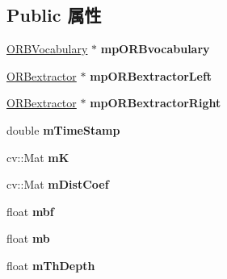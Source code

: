 \subsection*{Public 属性}
\begin{DoxyCompactItemize}
\item 
\hypertarget{classORB__SLAM2_1_1Frame_a4c54c9963da838cd6fa83a65930bd1b7}{\hyperlink{classDBoW2_1_1TemplatedVocabulary}{O\-R\-B\-Vocabulary} $\ast$ {\bfseries mp\-O\-R\-Bvocabulary}}\label{classORB__SLAM2_1_1Frame_a4c54c9963da838cd6fa83a65930bd1b7}

\item 
\hypertarget{classORB__SLAM2_1_1Frame_a5c4f28562114c30c6276f2e42aac6607}{\hyperlink{classORB__SLAM2_1_1ORBextractor}{O\-R\-Bextractor} $\ast$ {\bfseries mp\-O\-R\-Bextractor\-Left}}\label{classORB__SLAM2_1_1Frame_a5c4f28562114c30c6276f2e42aac6607}

\item 
\hypertarget{classORB__SLAM2_1_1Frame_a53cd56c00a153e8b54be49ea73b64672}{\hyperlink{classORB__SLAM2_1_1ORBextractor}{O\-R\-Bextractor} $\ast$ {\bfseries mp\-O\-R\-Bextractor\-Right}}\label{classORB__SLAM2_1_1Frame_a53cd56c00a153e8b54be49ea73b64672}

\item 
\hypertarget{classORB__SLAM2_1_1Frame_a7987de59d3b4bf655614e19db0c90278}{double {\bfseries m\-Time\-Stamp}}\label{classORB__SLAM2_1_1Frame_a7987de59d3b4bf655614e19db0c90278}

\item 
\hypertarget{classORB__SLAM2_1_1Frame_a6508d43259538370dcb77911122dc85b}{cv\-::\-Mat {\bfseries m\-K}}\label{classORB__SLAM2_1_1Frame_a6508d43259538370dcb77911122dc85b}

\item 
\hypertarget{classORB__SLAM2_1_1Frame_aef15cff1b0d7572f49975d3200ffd140}{cv\-::\-Mat {\bfseries m\-Dist\-Coef}}\label{classORB__SLAM2_1_1Frame_aef15cff1b0d7572f49975d3200ffd140}

\item 
\hypertarget{classORB__SLAM2_1_1Frame_afb4090340565194b372b2ce0d95f16fb}{float {\bfseries mbf}}\label{classORB__SLAM2_1_1Frame_afb4090340565194b372b2ce0d95f16fb}

\item 
\hypertarget{classORB__SLAM2_1_1Frame_a950131e5ed7fca2a73fc5a50e6d9b2de}{float {\bfseries mb}}\label{classORB__SLAM2_1_1Frame_a950131e5ed7fca2a73fc5a50e6d9b2de}

\item 
\hypertarget{classORB__SLAM2_1_1Frame_a15e0251e1e18b84f385ad817f0e8ba1a}{float {\bfseries m\-Th\-Depth}}\label{classORB__SLAM2_1_1Frame_a15e0251e1e18b84f385ad817f0e8ba1a}


\end{DoxyCompactItemize}
